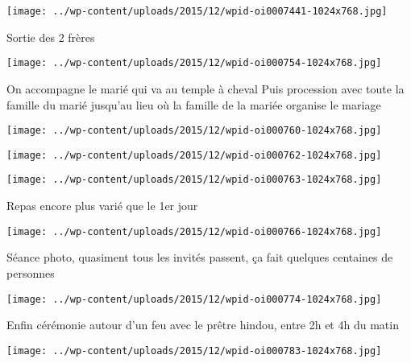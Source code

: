 \centerline{\texttt{[image: ../wp-content/uploads/2015/12/wpid-oi0007441-1024x768.jpg]} } 
 \newline
 Sortie des 2 frères \newline
 \newline
\centerline{\texttt{[image: ../wp-content/uploads/2015/12/wpid-oi000754-1024x768.jpg]} } 
 \newline
 On accompagne le marié qui va au temple à cheval \newline
 Puis procession avec toute la famille du marié jusqu'au lieu où la famille de la mariée organise le mariage \newline
 \newline
\centerline{\texttt{[image: ../wp-content/uploads/2015/12/wpid-oi000760-1024x768.jpg]} } 
 \newline
 \newline
\centerline{\texttt{[image: ../wp-content/uploads/2015/12/wpid-oi000762-1024x768.jpg]} } 
 \newline
 \newline
\centerline{\texttt{[image: ../wp-content/uploads/2015/12/wpid-oi000763-1024x768.jpg]} } 
 \newline
 Repas encore plus varié que le 1er jour \newline
 \newline
\centerline{\texttt{[image: ../wp-content/uploads/2015/12/wpid-oi000766-1024x768.jpg]} } 
 \newline
 Séance photo, quasiment tous les invités passent, ça fait quelques centaines de personnes \newline
 \newline
\centerline{\texttt{[image: ../wp-content/uploads/2015/12/wpid-oi000774-1024x768.jpg]} } 
 \newline
 Enfin cérémonie autour d'un feu avec le prêtre hindou, entre 2h et 4h du matin \newline
 \newline
\centerline{\texttt{[image: ../wp-content/uploads/2015/12/wpid-oi000783-1024x768.jpg]} } 
 \newline

\newpage
 
